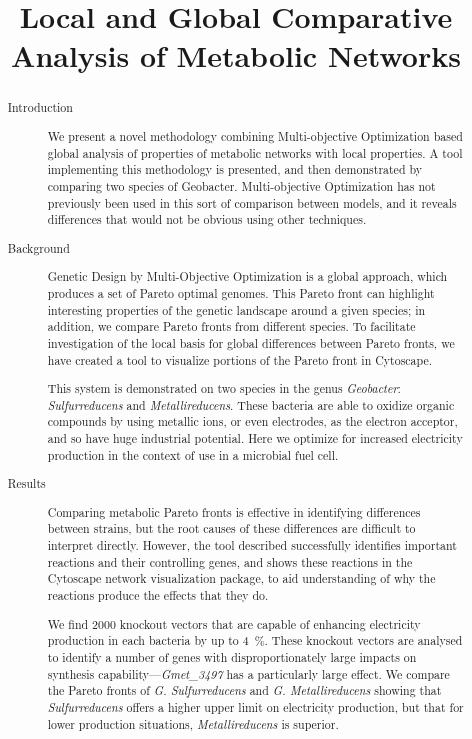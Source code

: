 \documentclass[a4paper,11pt]{article}
\begin{document}
\title{Local and Global Comparative Analysis of Metabolic Networks}
\date{}
\maketitle
\begin{abstract}
{\footnotesize
\begin{description}
\item[]
\item[Introduction] 
We present a novel methodology combining Multi-objective Optimization based global analysis of properties of metabolic networks with local properties. A tool implementing this methodology is presented, and then demonstrated by comparing two species of Geobacter. Multi-objective Optimization has not previously been used in this sort of comparison between models, and it reveals differences that would not be obvious using other techniques.

\item[Background]
Genetic Design by Multi-Objective Optimization is a global approach, which produces a set of Pareto optimal genomes. This Pareto front can highlight interesting properties of the genetic landscape around a given species; in addition, we compare Pareto fronts from different species. To facilitate investigation of the local basis for global  differences between Pareto fronts, we have created a tool to visualize portions of the Pareto front in Cytoscape.

This system is demonstrated on two species in the genus {\it Geobacter}: {\it Sulfurreducens} and {\it Metallireducens}. These bacteria are able to oxidize organic compounds by using metallic ions, or even electrodes, as the electron acceptor, and so have huge industrial potential. Here we optimize for increased electricity production in the context of use in a microbial fuel cell.

\item[Results]
Comparing metabolic Pareto fronts is effective in identifying differences between strains, but the root causes of these differences are difficult to interpret directly. However, the tool described successfully identifies important reactions and their controlling genes, and shows these reactions in the Cytoscape network visualization package, to aid understanding of why the reactions produce the effects that they do.

We find 2000 knockout vectors that are capable of enhancing electricity production in each bacteria by up to \SI{4}{\percent}. These knockout vectors are analysed to identify a number of genes with disproportionately large impacts on synthesis capability---{\it Gmet\_3497} has a particularly large effect. We compare the Pareto fronts of {\it G. Sulfurreducens} and {\it G. Metallireducens} showing that {\it Sulfurreducens} offers a higher upper limit on electricity production, but that for lower production situations, {\it Metallireducens} is superior.
\end{description}
}
\end{abstract}
\pagebreak
\end{document}
